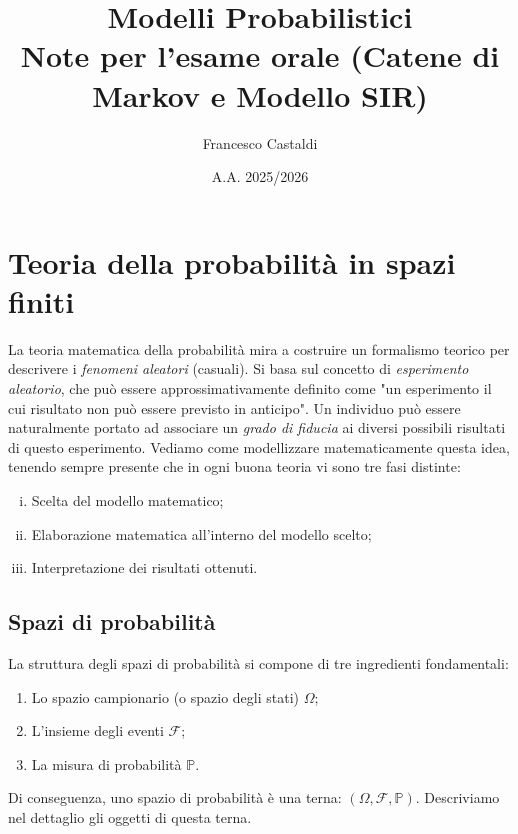 \documentclass[11pt, a4paper]{report}
\theoremstyle{plain}
\theoremstyle{definition}
\theoremstyle{remark}
\newcommand{\PP}{\mathbb{P}}
\newcommand{\F}{\mathcal{F}}
\newcommand{\1}{\mathbf{1}}
\begin{document}
\title{\Huge\textbf{Modelli Probabilistici}\\
\LARGE{Note per l'esame orale (Catene di Markov e Modello SIR)}}
\author{Francesco Castaldi}
\date{A.A. 2025/2026}

\maketitle

\tableofcontents
\newpage

\chapter{Teoria della probabilità in spazi finiti}

La teoria matematica della probabilità mira a costruire un formalismo teorico per descrivere i \emph{fenomeni aleatori} (casuali). Si basa sul concetto di \emph{esperimento aleatorio}, che può essere approssimativamente definito come "un esperimento il cui risultato non può essere previsto in anticipo". Un individuo può essere naturalmente portato ad associare un \emph{grado di fiducia} ai diversi possibili risultati di questo esperimento. Vediamo come modellizzare matematicamente questa idea, tenendo sempre presente che in ogni buona teoria vi sono tre fasi distinte:
\begin{enumerate}[(i)]
    \item Scelta del modello matematico;
    \item Elaborazione matematica all'interno del modello scelto;
    \item Interpretazione dei risultati ottenuti.
\end{enumerate}

\section{Spazi di probabilità}

La struttura degli spazi di probabilità si compone di tre ingredienti fondamentali:
\begin{enumerate}
    \item Lo spazio campionario (o spazio degli stati) $\Omega$;
    \item L'insieme degli eventi $\F$;
    \item La misura di probabilità $\PP$.
\end{enumerate}
Di conseguenza, uno spazio di probabilità è una terna: $(\Omega, \F, \PP)$. Descriviamo nel dettaglio gli oggetti di questa terna.
\end{document}
